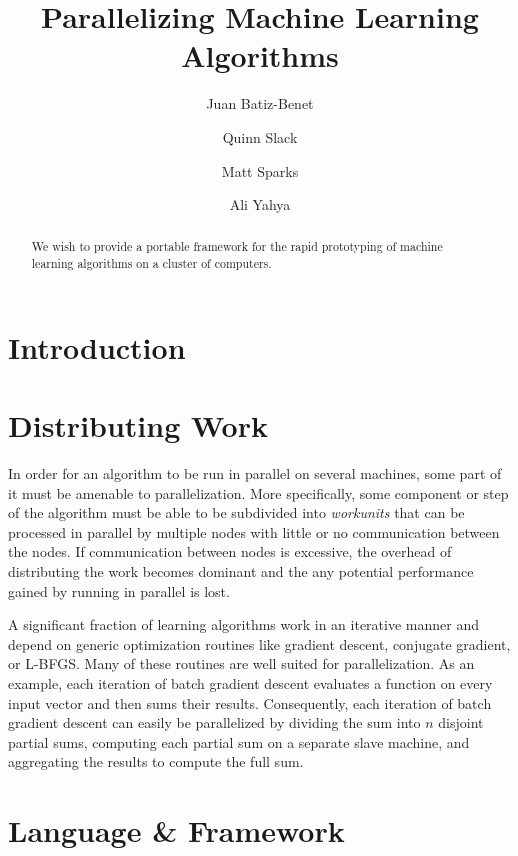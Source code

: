 \documentclass[%
  final,
  notitlepage,
  narroweqnarray,
  inline,
]{ieee}
\begin{document}
\title{Parallelizing Machine Learning Algorithms}

\author[SHORT NAMES]{
  Juan Batiz-Benet \\
  \and{\quad\quad}
  Quinn Slack \\
  \and{\quad\quad}
  Matt Sparks \\
  \and{\quad\quad}
  Ali Yahya
}

\maketitle

\begin{abstract}
We wish to provide a portable framework for the rapid prototyping of machine
learning algorithms on a cluster of computers.
\end{abstract}

\section{Introduction}

\section{Distributing Work}

In order for an algorithm to be run in parallel on several machines, some part
of it must be amenable to parallelization. More specifically, some component or
step of the algorithm must be able to be subdivided into \emph{workunits} that
can be processed in parallel by multiple nodes with little or no communication
between the nodes. If communication between nodes is excessive, the overhead of
distributing the work becomes dominant and the any potential performance gained
by running in parallel is lost.

A significant fraction of learning algorithms work in an iterative manner and
depend on generic optimization routines like gradient descent, conjugate
gradient, or L-BFGS. Many of these routines are well suited for parallelization.
As an example, each iteration of batch gradient descent evaluates a function on
every input vector and then sums their results. Consequently, each iteration of
batch gradient descent can easily be parallelized by dividing the sum into $n$
disjoint partial sums, computing each partial sum on a separate slave machine,
and aggregating the results to compute the full sum.

\section{Language \& Framework}
\end{document}
